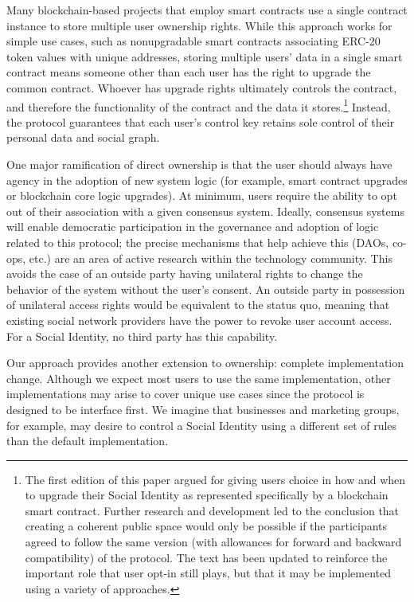 \documentclass[12pt,letterpaper]{article}
\begin{document}
Many blockchain-based projects that employ smart contracts use a single contract instance to
store multiple user ownership rights. While this approach works for simple use cases, such
as nonupgradable smart contracts associating ERC-20\cite{erc20} token values with unique
addresses, storing multiple users' data in a single smart contract means someone other than
each user has the right to upgrade the common contract. Whoever has upgrade rights
ultimately controls the contract, and therefore the functionality of the contract and the
data it stores.\footnote{The first edition of this paper argued for giving users choice in
  how and when to upgrade their Social Identity as represented specifically by a blockchain
  smart contract. Further research and development led to the conclusion that creating a
  coherent public space would only be possible if the participants agreed to follow the same
  version (with allowances for forward and backward compatibility) of the protocol. The text
  has been updated to reinforce the important role that user opt-in still plays, but that it
  may be implemented using a variety of approaches.} Instead, the protocol guarantees that
each user's control key retains sole control of their personal data and social graph.

One major ramification of direct ownership is that the user should always have agency in the
adoption of new system logic (for example, smart contract upgrades or blockchain core logic
upgrades). At minimum, users require the ability to opt out of their association with a
given consensus system. Ideally, consensus systems will enable democratic participation in
the governance and adoption of logic related to this protocol; the precise mechanisms that
help achieve this (DAOs, co-ops, etc.) are an area of active research within the technology
community.  This avoids the case of an outside party having unilateral rights to change the
behavior of the system without the user's consent. An outside party in possession of
unilateral access rights would be equivalent to the status quo, meaning that existing social
network providers have the power to revoke user account access. For a Social Identity, no
third party has this capability.

Our  approach provides another extension to ownership: complete
implementation change. Although we expect most users to use the same implementation, other
implementations may arise to cover unique use cases since the protocol is designed to be
interface first. We imagine that businesses and marketing groups, for example, may desire to
control a Social Identity using a different set of rules than the default implementation.
\end{document}
